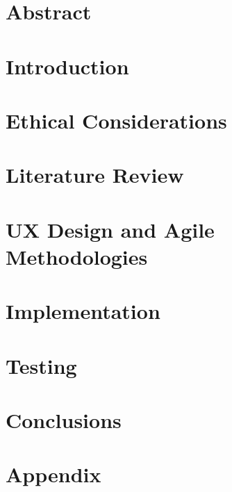 \documentclass[oneside,openright,titlepage,numbers=noenddot,headinclude,footinclude=true,cleardoublepage=empty,listof=totoc,paper=a4,fontsize=11pt,english,BCOR=5mm]{scrreprt}
\begin{document}
  \frenchspacing
  \raggedbottom{}

  \pagestyle{plain}

  \singlespacing{}
  
  

  \onehalfspacing{}
  

  \chapter*{Abstract}
  

  

  \cleardoublepage{}
  \pagestyle{scrheadings}
  \onehalfspacing{}

  \chapter{Introduction}\label{c:Introduction}
  

  \chapter{Ethical Considerations}\label{c:Ethical-Considerations}
  

  \chapter{Literature Review}\label{c:Literature-Review}
  

  \chapter{UX Design and Agile Methodologies}\label{c:UX-Design-Agile-Methodologies}
  

  \chapter{Implementation}\label{c:Implementation}
  

  \chapter{Testing}\label{c:Testing}
  

  \chapter{Conclusions}\label{c:Conclusions}
  

  \pagestyle{plain}
  \cleardoublepage{}
  \appendix
  \singlespacing{}
  \cleardoublepage{}
  
  \cleardoublepage{}
  \chapter{Appendix}\label{c:Appendix-A}
  
  \cleardoublepage{}
\end{document}
